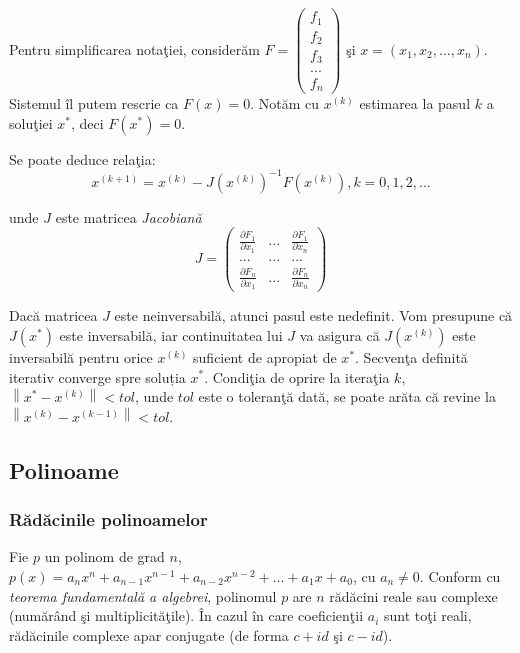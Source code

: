 \documentclass{exam}
\begin{document}
Pentru simplificarea notaţiei, considerăm
$F=\left(\begin{array}{c}f_{1}\\f_{2}\\f_{3}\\...\\f_{n} \end{array}\right)$ şi
$x=(x_{1},x_{2},...,x_{n})$. Sistemul îl putem rescrie ca $F(x)=0$.
Notăm cu $x^{(k)}$ estimarea la pasul $k$ a soluţiei $x^{*}$, deci $F(x^{*})=0$.

Se poate deduce relaţia:
$$x^{(k+1)} = x^{(k)} - J(x^{(k)})^{-1}F(x^{(k)}), k=0,1,2,... $$

\noindent  unde $J$ este matricea \textit{Jacobiană}
\[J=  \left( \begin{array}{ccc}
			\frac{\partial F_{1}}{ \partial x_{1}} & ...   & \frac{\partial F_{1}}{ \partial x_{n}} \\
			{...}                                  & {...} & {...}                                  \\
			\frac{\partial F_{n}}{ \partial x_{1}} & ...   & \frac{\partial F_{n}}{ \partial x_{n}}
		\end{array} \right)\]

Dacă matricea $J$ este neinversabilă, atunci pasul este nedefinit. Vom presupune
că $J(x^*)$ este inversabilă, iar continuitatea lui $J$ va asigura că
$J(x^{(k)})$ este inversabilă pentru orice $x^{(k)}$ suficient de apropiat de
$x^*$. Secvenţa definită iterativ converge spre soluția $x^*$.
Condiţia de oprire la iteraţia $k$, $\left \|x^{*}-x^{(k)}  \right \|<tol$, unde
$tol$ este o toleranţă dată, se poate arăta că revine la
$\left \|x^{(k)}-x^{(k-1)}  \right \|<tol.$

\subsection{Polinoame}

\subsubsection{Rădăcinile polinoamelor}

Fie $p$ un polinom de grad $n$,
$p(x)= a_{n}x^{n}+a_{n-1}x^{n-1}+a_{n-2}x^{n-2}+...+a_{1}x+a_{0}$, cu
$a_{n}\neq 0$. Conform cu \textit{teorema fundamentală a algebrei}, polinomul
$p$ are $n$ rădăcini reale sau complexe (numărând şi multiplicităţile). În cazul
în care coeficienţii $a_{i}$ sunt toţi reali,  rădăcinile complexe apar
conjugate (de forma $c+id$ şi $c-id$).
\end{document}
